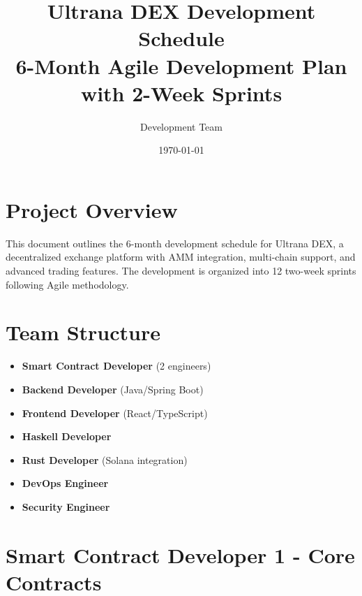 \documentclass{article}
\title{\textbf{Ultrana DEX Development Schedule}\\[0.5em]\large 6-Month Agile Development Plan with 2-Week Sprints}
\author{Development Team}
\date{\today}
\begin{document}
\maketitle

\section*{Project Overview}
This document outlines the 6-month development schedule for Ultrana DEX, a decentralized exchange platform with AMM integration, multi-chain support, and advanced trading features. The development is organized into 12 two-week sprints following Agile methodology.

\section*{Team Structure}
\begin{itemize}
    \item \textbf{Smart Contract Developer} (2 engineers)
    \item \textbf{Backend Developer} (Java/Spring Boot)
    \item \textbf{Frontend Developer} (React/TypeScript)
    \item \textbf{Haskell Developer}
    \item \textbf{Rust Developer} (Solana integration)
    \item \textbf{DevOps Engineer}
    \item \textbf{Security Engineer}
\end{itemize}

\section*{Smart Contract Developer 1 - Core Contracts}
\end{document}
